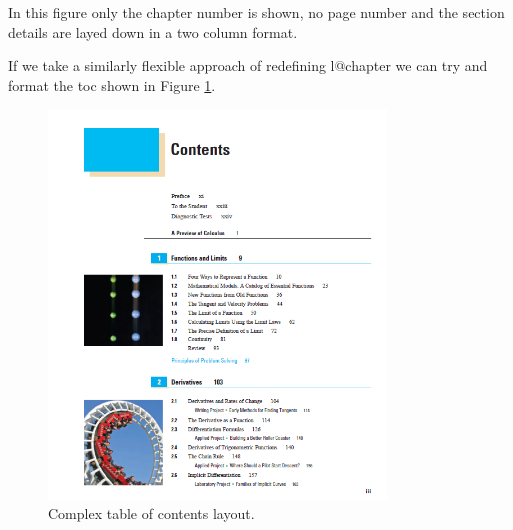 \documentclass[10pt]{book}
\begin{document}
In this figure only the chapter number is shown, no page number and the section details are layed down in a two column format.


If we take a similarly flexible approach of redefining l@chapter we can try and format the toc shown in Figure \ref{fig:tocsteward}.

\begin{figure}[tp]
\includegraphics[width=0.8\textwidth]{contents02}
\caption{Complex table of contents layout.}
\label{fig:tocsteward}
\end{figure}
\end{document}
